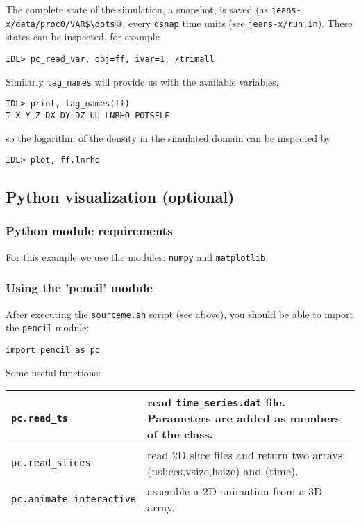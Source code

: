\documentclass[a4paper,12pt]{article}
\begin{document}
The complete state of the simulation, a snapshot, is saved (as
\verb|jeans-x/data/proc0/VAR$\dots|@, every \verb|dsnap|
time units
(see \verb|jeans-x/run.in|). These states can be inspected, for example
\begin{verbatim}
IDL> pc_read_var, obj=ff, ivar=1, /trimall
\end{verbatim}
Similarly \verb|tag_names| will provide us with the available variables, 
\begin{verbatim}
IDL> print, tag_names(ff)
T X Y Z DX DY DZ UU LNRHO POTSELF
\end{verbatim}
so the logarithm of the density in the simulated domain can be inspected by
\begin{verbatim}
IDL> plot, ff.lnrho
\end{verbatim}


\subsection{Python visualization (optional)}
\subsubsection{Python module requirements}
For this example we use the modules: \verb|numpy| and \verb|matplotlib|.

\subsubsection{Using the 'pencil' module}
After executing the \verb|sourceme.sh| script (see above), you should be able to import the \verb|pencil| module:

\begin{verbatim}
import pencil as pc
\end{verbatim}

Some useful functions:
\begin{center}
\begin{tabular}{|l|l|}\hline
\verb|pc.read_ts| & read \verb|time_series.dat| file. Parameters are added as members of the class. \\\hline
\verb|pc.read_slices| & read 2D slice files and return two arrays: (nslices,vsize,hsize) and (time). \\\hline
\verb|pc.animate_interactive| & assemble a 2D animation from a 3D array. \\\hline
\end{tabular}
\end{center}


% 
\end{document}
